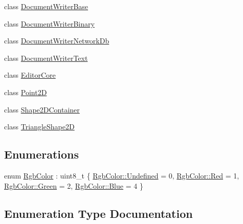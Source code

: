 \begin{DoxyCompactItemize}
class \hyperlink{classGraphicalEditorCore_1_1DocumentWriterBase}{Document\+Writer\+Base}
\item 
class \hyperlink{classGraphicalEditorCore_1_1DocumentWriterBinary}{Document\+Writer\+Binary}
\item 
class \hyperlink{classGraphicalEditorCore_1_1DocumentWriterNetworkDb}{Document\+Writer\+Network\+Db}
\item 
class \hyperlink{classGraphicalEditorCore_1_1DocumentWriterText}{Document\+Writer\+Text}
\item 
class \hyperlink{classGraphicalEditorCore_1_1EditorCore}{Editor\+Core}
\item 
class \hyperlink{classGraphicalEditorCore_1_1Point2D}{Point2D}
\item 
class \hyperlink{classGraphicalEditorCore_1_1Shape2DContainer}{Shape2\+D\+Container}
\item 
class \hyperlink{classGraphicalEditorCore_1_1TriangleShape2D}{Triangle\+Shape2D}
\end{DoxyCompactItemize}
\subsection*{Enumerations}
\begin{DoxyCompactItemize}
\item 
enum \hyperlink{namespaceGraphicalEditorCore_ada0d86f7dc1329a6731f908a95f68a38}{Rgb\+Color} \+: uint8\+\_\+t \{ \hyperlink{namespaceGraphicalEditorCore_ada0d86f7dc1329a6731f908a95f68a38aec0fc0100c4fc1ce4eea230c3dc10360}{Rgb\+Color\+::\+Undefined} = 0, 
\hyperlink{namespaceGraphicalEditorCore_ada0d86f7dc1329a6731f908a95f68a38aee38e4d5dd68c4e440825018d549cb47}{Rgb\+Color\+::\+Red} = 1, 
\hyperlink{namespaceGraphicalEditorCore_ada0d86f7dc1329a6731f908a95f68a38ad382816a3cbeed082c9e216e7392eed1}{Rgb\+Color\+::\+Green} = 2, 
\hyperlink{namespaceGraphicalEditorCore_ada0d86f7dc1329a6731f908a95f68a38a9594eec95be70e7b1710f730fdda33d9}{Rgb\+Color\+::\+Blue} = 4
 \}
\end{DoxyCompactItemize}


\subsection{Enumeration Type Documentation}
